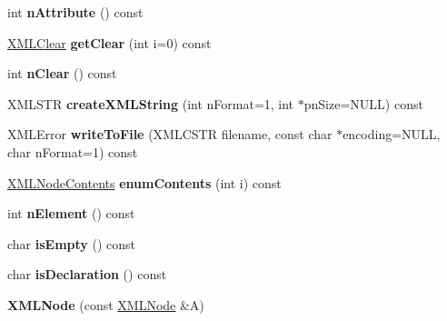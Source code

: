 \begin{DoxyCompactItemize}
\item 
int {\bfseries n\+Attribute} () const \hypertarget{struct_x_m_l_node_a9561f62b9ed1fa653fe9135c4f16a41d}{}\label{struct_x_m_l_node_a9561f62b9ed1fa653fe9135c4f16a41d}

\item 
\hyperlink{struct_x_m_l_clear}{X\+M\+L\+Clear} {\bfseries get\+Clear} (int i=0) const \hypertarget{struct_x_m_l_node_ab99fbcb5534ab2194889c4802e290354}{}\label{struct_x_m_l_node_ab99fbcb5534ab2194889c4802e290354}

\item 
int {\bfseries n\+Clear} () const \hypertarget{struct_x_m_l_node_a87d34f1ba1ba7d49e8aeacc63548dead}{}\label{struct_x_m_l_node_a87d34f1ba1ba7d49e8aeacc63548dead}

\item 
X\+M\+L\+S\+TR {\bfseries create\+X\+M\+L\+String} (int n\+Format=1, int $\ast$pn\+Size=N\+U\+LL) const \hypertarget{struct_x_m_l_node_ac8710ba5e7ff6e62a222445501ef9972}{}\label{struct_x_m_l_node_ac8710ba5e7ff6e62a222445501ef9972}

\item 
X\+M\+L\+Error {\bfseries write\+To\+File} (X\+M\+L\+C\+S\+TR filename, const char $\ast$encoding=N\+U\+LL, char n\+Format=1) const \hypertarget{struct_x_m_l_node_ab8d92d057c0072cc195b1935b2f53d80}{}\label{struct_x_m_l_node_ab8d92d057c0072cc195b1935b2f53d80}

\item 
\hyperlink{struct_x_m_l_node_contents}{X\+M\+L\+Node\+Contents} {\bfseries enum\+Contents} (int i) const \hypertarget{struct_x_m_l_node_a68f4667099835401fc33f2b122464666}{}\label{struct_x_m_l_node_a68f4667099835401fc33f2b122464666}

\item 
int {\bfseries n\+Element} () const \hypertarget{struct_x_m_l_node_a8e9538deb9144dcab39b3a510a8202f1}{}\label{struct_x_m_l_node_a8e9538deb9144dcab39b3a510a8202f1}

\item 
char {\bfseries is\+Empty} () const \hypertarget{struct_x_m_l_node_a764ce0ff117af3e30ab0959114d36f9c}{}\label{struct_x_m_l_node_a764ce0ff117af3e30ab0959114d36f9c}

\item 
char {\bfseries is\+Declaration} () const \hypertarget{struct_x_m_l_node_a71df27d54a2dc09b0a456406a7e8c6d3}{}\label{struct_x_m_l_node_a71df27d54a2dc09b0a456406a7e8c6d3}

\item 
{\bfseries X\+M\+L\+Node} (const \hyperlink{struct_x_m_l_node}{X\+M\+L\+Node} \&A)\hypertarget{struct_x_m_l_node_a138099a1355b9d4103c239d9042adad3}{}\label{struct_x_m_l_node_a138099a1355b9d4103c239d9042adad3}


\end{DoxyCompactItemize}
